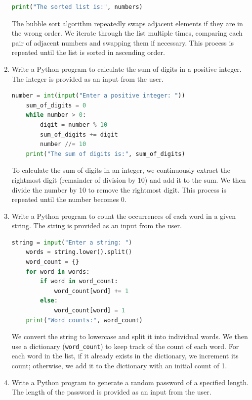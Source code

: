 \documentclass[12pt]{book}
\begin{document}
\begin{enumerate}
\begin{lstlisting}[language=Python]
    print("The sorted list is:", numbers)
    \end{lstlisting}
    
    The bubble sort algorithm repeatedly swaps adjacent elements if they are in the wrong order. We iterate through the list multiple times, comparing each pair of adjacent numbers and swapping them if necessary. This process is repeated until the list is sorted in ascending order.
    
    \item Write a Python program to calculate the sum of digits in a positive integer. The integer is provided as an input from the user.
    
    \begin{lstlisting}[language=Python]
    number = int(input("Enter a positive integer: "))
    sum_of_digits = 0
    while number > 0:
        digit = number % 10
        sum_of_digits += digit
        number //= 10
    print("The sum of digits is:", sum_of_digits)
    \end{lstlisting}
    
    To calculate the sum of digits in an integer, we continuously extract the rightmost digit (remainder of division by 10) and add it to the sum. We then divide the number by 10 to remove the rightmost digit. This process is repeated until the number becomes 0.
    
    \item Write a Python program to count the occurrences of each word in a given string. The string is provided as an input from the user.
    
    \begin{lstlisting}[language=Python]
    string = input("Enter a string: ")
    words = string.lower().split()
    word_count = {}
    for word in words:
        if word in word_count:
            word_count[word] += 1
        else:
            word_count[word] = 1
    print("Word counts:", word_count)
    \end{lstlisting}
    
    We convert the string to lowercase and split it into individual words. We then use a dictionary (\texttt{word\_count}) to keep track of the count of each word. For each word in the list, if it already exists in the dictionary, we increment its count; otherwise, we add it to the dictionary with an initial count of 1.
    
    \item Write a Python program to generate a random password of a specified length. The length of the password is provided as an input from the user.
    

\end{enumerate}
\end{document}
